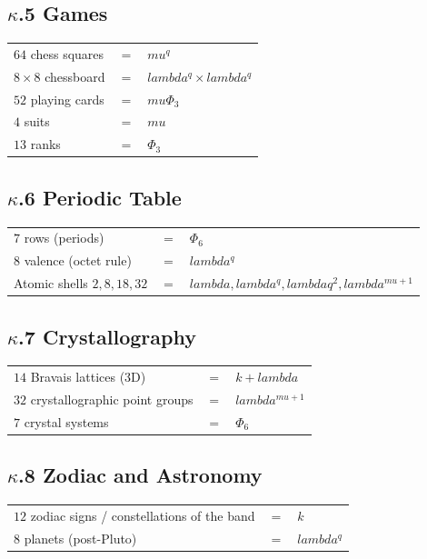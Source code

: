 \documentclass[12pt,a4paper]{article}
\def\lambda{lambda}%
\def\mu{mu}%
\def\Phi#1{Phi#1}%
\theoremstyle{definition}
\begin{document}
\subsection*{$\kappa$.5 \quad Games}
\begin{center}
\begin{tabular}{lcl}
$64$ chess squares & $=$ & $\mu^q$ \\
$8\times 8$ chessboard & $=$ & $\lambda^q\times\lambda^q$ \\
$52$ playing cards & $=$ & $\mu\Phi_3$ \\
$4$ suits & $=$ & $\mu$ \\
$13$ ranks & $=$ & $\Phi_3$ \\
\end{tabular}
\end{center}

\subsection*{$\kappa$.6 \quad Periodic Table}
\begin{center}
\begin{tabular}{lcl}
$7$ rows (periods) & $=$ & $\Phi_6$ \\
$8$ valence (octet rule) & $=$ & $\lambda^q$ \\
Atomic shells $2, 8, 18, 32$ & $=$ & $\lambda,\lambda^q,\lambda q^2,\lambda^{\mu+1}$ \\
\end{tabular}
\end{center}

\subsection*{$\kappa$.7 \quad Crystallography}
\begin{center}
\begin{tabular}{lcl}
$14$ Bravais lattices (3D) & $=$ & $k + \lambda$ \\
$32$ crystallographic point groups & $=$ & $\lambda^{\mu+1}$ \\
$7$ crystal systems & $=$ & $\Phi_6$ \\
\end{tabular}
\end{center}

\subsection*{$\kappa$.8 \quad Zodiac and Astronomy}
\begin{center}
\begin{tabular}{lcl}
$12$ zodiac signs / constellations of the band & $=$ & $k$ \\
$8$ planets (post-Pluto) & $=$ & $\lambda^q$ \\
\end{tabular}
\end{center}
\end{document}
